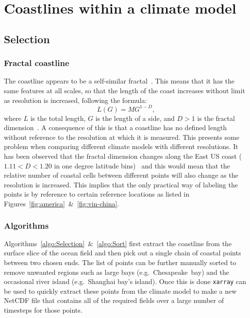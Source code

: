 

\section{Coastlines within a climate model}
\label{sec:coast}
\subsection{Selection}
 \subsubsection{Fractal coastline}
 \label{sec:fractal}
 The coastline appears to be a self-similar fractal~\cite{mandelbrot1967long,
 richardson1961problem}. This means that it has the same features at all
 scales, so that the length of the coast increases without limit as resolution
 is increased, following the formula:
 \begin{equation}
 L(G)=M G^{1-D},
 \end{equation}
 where $L$ is the total length, $G$ is the length of a side,
 and $D>1$ is the fractal dimension~\cite{mandelbrot1967long}.
 A consequence of this is that a coastline has no defined length without
 reference to the resolution at which it is measured.
 This presents some problem when comparing different climate models with different resolutions.
 It has been observed that the fractal dimension changes
  along the East US coast ($1.11<D<1.20$ in one degree latitude bins)~\cite{jiang1998fractal}
 and this would mean that the relative number of coastal cells between different
 points will also change as the resolution is increased.
 This implies that the only practical way of labeling the points is by
 reference to certain reference locations as listed in
 Figures~\ref{fig:america}~\&~\ref{fig:vin-china}.

\subsubsection{Algorithms}
\label{sec:coast-algorithms}
Algorithms~\ref{algo:Selection}~\&~\ref{algo:Sort} first extract the coastline
from the surface slice of the ocean field and then pick out a single chain of
coastal points between two chosen ends. The list of points can be further
manually sorted to remove unwanted regions such as large bays
(e.g.~Chesapeake~bay)
and the occasional river island (e.g.~Shanghai bay's island). Once this is
done \texttt{xarray} can be used to quickly extract these points
from the climate model to make a new NetCDF file that contains all of the
required fields over a large number of timesteps for those points.


